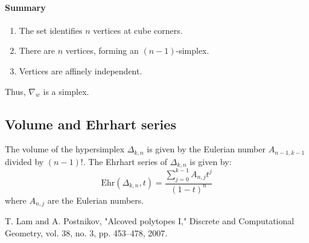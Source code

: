 \documentclass[12pt]{article}
\theoremstyle{definition}
\numberwithin{equation}{subsection}
\begin{document}
\paragraph{Summary}
\begin{enumerate}
    \item The set identifies $n$ vertices at cube corners.
    \item There are $n$ vertices, forming an $(n-1)$-simplex.
    \item Vertices are affinely independent.
\end{enumerate}
Thus, $\nabla_w$ is a simplex.

\subsection{Volume and Ehrhart series}
The volume of the hypersimplex $\Delta_{k,n}$ is given by the Eulerian number $A_{n-1,k-1}$ divided by $(n-1)!$. The Ehrhart series of $\Delta_{k,n}$ is given by:
\[
\text{Ehr}(\Delta_{k,n}, t) = \frac{\sum_{j=0}^{k-1} A_{n,j} t^j}{(1-t)^n}
\]
where $A_{n,j}$ are the Eulerian numbers.



\begin{thebibliography}{1}

T. Lam and A. Postnikov, "Alcoved polytopes I," Discrete and Computational Geometry, vol. 38, no. 3, pp. 453--478, 2007.

\end{thebibliography}
\end{document}
